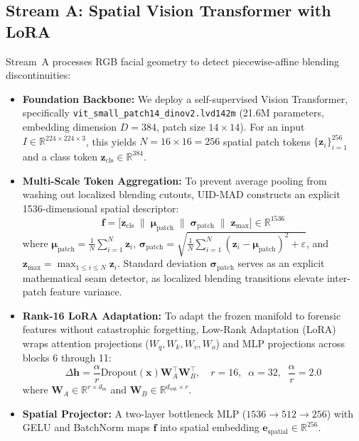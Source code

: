 \documentclass[11pt,a4paper]{article}
\begin{document}
\subsection{Stream A: Spatial Vision Transformer with LoRA}
Stream~A processes RGB facial geometry to detect piecewise-affine blending discontinuities:
\begin{itemize}[leftmargin=*]
    \item \textbf{Foundation Backbone:} We deploy a self-supervised Vision Transformer, specifically \texttt{vit\_small\_patch14\_dinov2.lvd142m} \cite{oquab2023dinov2} (21.6M parameters, embedding dimension $D = 384$, patch size $14 \times 14$). For an input $I \in \mathbb{R}^{224 \times 224 \times 3}$, this yields $N = 16 \times 16 = 256$ spatial patch tokens $\{\mathbf{z}_i\}_{i=1}^{256}$ and a class token $\mathbf{z}_{\text{cls}} \in \mathbb{R}^{384}$.
    \item \textbf{Multi-Scale Token Aggregation:} To prevent average pooling from washing out localized blending cutouts, UID-MAD constructs an explicit 1536-dimensional spatial descriptor:
    \begin{equation}
        \mathbf{f} = \Big[ \mathbf{z}_{\text{cls}} \;\big\|\; \boldsymbol{\mu}_{\text{patch}} \;\big\|\; \boldsymbol{\sigma}_{\text{patch}} \;\big\|\; \mathbf{z}_{\text{max}} \Big] \in \mathbb{R}^{1536}
        \label{eq:spatial_pool}
    \end{equation}
    where $\boldsymbol{\mu}_{\text{patch}} = \frac{1}{N} \sum_{i=1}^N \mathbf{z}_i$, $\boldsymbol{\sigma}_{\text{patch}} = \sqrt{\frac{1}{N} \sum_{i=1}^N (\mathbf{z}_i - \boldsymbol{\mu}_{\text{patch}})^2 + \varepsilon}$, and $\mathbf{z}_{\text{max}} = \max_{1 \le i \le N} \mathbf{z}_i$. Standard deviation $\boldsymbol{\sigma}_{\text{patch}}$ serves as an explicit mathematical seam detector, as localized blending transitions elevate inter-patch feature variance.
    \item \textbf{Rank-16 LoRA Adaptation:} To adapt the frozen manifold to forensic features without catastrophic forgetting, Low-Rank Adaptation (LoRA) \cite{hu2021lora} wraps attention projections ($W_q, W_k, W_v, W_o$) and MLP projections across blocks 6 through 11:
    \begin{equation}
        \Delta \mathbf{h} = \frac{\alpha}{r} \text{Dropout}(\mathbf{x}) \mathbf{W}_A^\top \mathbf{W}_B^\top, \quad r = 16, \;\; \alpha = 32, \;\; \frac{\alpha}{r} = 2.0
    \end{equation}
    where $\mathbf{W}_A \in \mathbb{R}^{r \times d_{\text{in}}}$ and $\mathbf{W}_B \in \mathbb{R}^{d_{\text{out}} \times r}$.
    \item \textbf{Spatial Projector:} A two-layer bottleneck MLP ($1536 \to 512 \to 256$) with GELU and BatchNorm maps $\mathbf{f}$ into spatial embedding $\mathbf{e}_{\text{spatial}} \in \mathbb{R}^{256}$.
\end{itemize}
\end{document}
